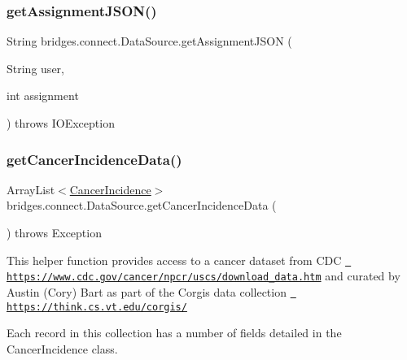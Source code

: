 \mbox{\label{classbridges_1_1connect_1_1_data_source_af55c85da71b588f64ff4b46dbacab7f4}} 
\subsubsection{\texorpdfstring{getAssignmentJSON()}{getAssignmentJSON()}\hspace{0.1cm}{\footnotesize\ttfamily [2/2]}}
{\footnotesize\ttfamily String bridges.\+connect.\+Data\+Source.\+get\+Assignment\+J\+S\+ON (\begin{DoxyParamCaption}\item[{String}]{user,  }\item[{int}]{assignment }\end{DoxyParamCaption}) throws I\+O\+Exception}

\mbox{\label{classbridges_1_1connect_1_1_data_source_a320ce56eeb655c54c0fbed455e0d9f5e}} 
\subsubsection{\texorpdfstring{getCancerIncidenceData()}{getCancerIncidenceData()}}
{\footnotesize\ttfamily Array\+List$<$\mbox{\hyperlink{classbridges_1_1data__src__dependent_1_1_cancer_incidence}{Cancer\+Incidence}}$>$ bridges.\+connect.\+Data\+Source.\+get\+Cancer\+Incidence\+Data (\begin{DoxyParamCaption}{ }\end{DoxyParamCaption}) throws Exception}

This helper function provides access to a cancer dataset from C\+DC \href{https://www.cdc.gov/cancer/npcr/uscs/download_data.htm}{\texttt{ https\+://www.\+cdc.\+gov/cancer/npcr/uscs/download\+\_\+data.\+htm}} and curated by Austin (Cory) Bart as part of the Corgis data collection \href{https://think.cs.vt.edu/corgis/}{\texttt{ https\+://think.\+cs.\+vt.\+edu/corgis/}}

Each record in this collection has a number of fields detailed in the Cancer\+Incidence class.

